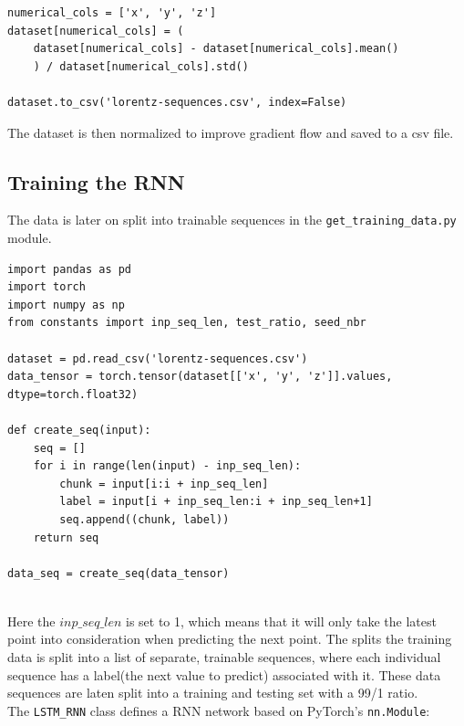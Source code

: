\documentclass[11pt]{article}
\begin{document}
\begin{lstlisting}
numerical_cols = ['x', 'y', 'z']
dataset[numerical_cols] = (
    dataset[numerical_cols] - dataset[numerical_cols].mean()
    ) / dataset[numerical_cols].std()

dataset.to_csv('lorentz-sequences.csv', index=False)
\end{lstlisting}

The dataset is then normalized to improve gradient flow and saved to a csv file. \\

\subsection{Training the RNN}

The data is later on split into trainable sequences in the \texttt{get\_training\_data.py} module.
\begin{lstlisting}
import pandas as pd
import torch
import numpy as np
from constants import inp_seq_len, test_ratio, seed_nbr

dataset = pd.read_csv('lorentz-sequences.csv')
data_tensor = torch.tensor(dataset[['x', 'y', 'z']].values, dtype=torch.float32)

def create_seq(input):
    seq = []
    for i in range(len(input) - inp_seq_len):
        chunk = input[i:i + inp_seq_len]
        label = input[i + inp_seq_len:i + inp_seq_len+1]
        seq.append((chunk, label))
    return seq

data_seq = create_seq(data_tensor)
    
\end{lstlisting}

Here the $inp\_seq\_len$ is set to 1, which means that it will only take the latest point into consideration when predicting the next point. The splits the training data is split into a list of separate, trainable sequences, where each individual sequence has a label(the next value to predict) associated with it. These data sequences are laten split into a training and testing set with a 99/1 ratio. \\

The \texttt{LSTM\_RNN} class defines a RNN network based on PyTorch's \texttt{nn.Module}:
\end{document}
